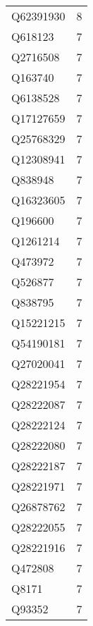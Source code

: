 \begin{tabular}{lr}
   Q62391930 &                             8 \\
     Q618123 &                             7 \\
    Q2716508 &                             7 \\
     Q163740 &                             7 \\
    Q6138528 &                             7 \\
   Q17127659 &                             7 \\
   Q25768329 &                             7 \\
   Q12308941 &                             7 \\
     Q838948 &                             7 \\
   Q16323605 &                             7 \\
     Q196600 &                             7 \\
    Q1261214 &                             7 \\
     Q473972 &                             7 \\
     Q526877 &                             7 \\
     Q838795 &                             7 \\
   Q15221215 &                             7 \\
   Q54190181 &                             7 \\
   Q27020041 &                             7 \\
   Q28221954 &                             7 \\
   Q28222087 &                             7 \\
   Q28222124 &                             7 \\
   Q28222080 &                             7 \\
   Q28222187 &                             7 \\
   Q28221971 &                             7 \\
   Q26878762 &                             7 \\
   Q28222055 &                             7 \\
   Q28221916 &                             7 \\
     Q472808 &                             7 \\
       Q8171 &                             7 \\
      Q93352 &                             7 \\

\end{tabular}
